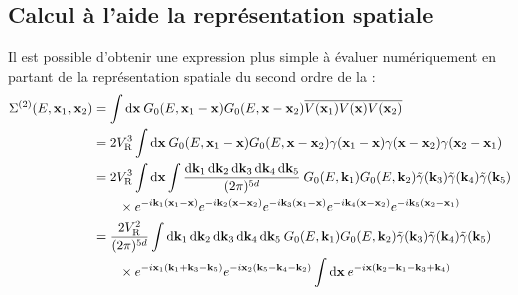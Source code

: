 \subsection{Calcul à l'aide la représentation spatiale}
Il est possible d'obtenir une expression plus simple à évaluer numériquement en partant de la représentation spatiale du second ordre de la \selfenergy :
\begin{align}
\Sigma^{(2)}(E,\mathbf{x}_{\mathrm{1}},\mathbf{x}_{\mathrm{2}}) &= \int{\diff \mathbf{x} \: G_0(E,\mathbf{x}_{\mathrm{1}} - \mathbf{x}) G_0(E,\mathbf{x}-\mathbf{x}_{\mathrm{2}}) \overline{V(\mathbf{x}_{\mathrm{1}})V(\mathbf{x})V(\mathbf{x}_{\mathrm{2}})}} \\
&=2 \VR^3 \int{\diff\mathbf{x} \: G_0(E,\mathbf{x}_{\mathrm{1}} - \mathbf{x}) G_0(E,\mathbf{x}-\mathbf{x}_{\mathrm{2}}) \gamma(\mathbf{x}_{\mathrm{1}}-\mathbf{x})\gamma(\mathbf{x}-\mathbf{x}_{\mathrm{2}})\gamma(\mathbf{x}_{\mathrm{2}}-\mathbf{x}_{\mathrm{1}})} \\
&=2 \VR^3 \int{\diff\mathbf{x} \int{\frac{\diff\mathbf{k}_{\mathrm{1}}\diff\mathbf{k}_{\mathrm{2}}\diff\mathbf{k}_{\mathrm{3}}\diff\mathbf{k}_{\mathrm{4}}\diff\mathbf{k}_{\mathrm{5}}}{(2\pi)^{5d}}\: G_0(E,\mathbf{k}_{\mathrm{1}}) G_0(E,\mathbf{k}_{\mathrm{2}}) \tilde{\gamma}(\mathbf{k}_{\mathrm{3}})\tilde{\gamma}(\mathbf{k}_{\mathrm{4}})\tilde{\gamma}(\mathbf{k}_{\mathrm{5}}) }} \\
&\nonumber \qquad\times e^{-i\mathbf{k}_{\mathrm{1}}(\mathbf{x}_{\mathrm{1}}-\mathbf{x})} e^{-i\mathbf{k}_{\mathrm{2}}(\mathbf{x}-\mathbf{x}_{\mathrm{2}})} e^{-i\mathbf{k}_{\mathrm{3}}(\mathbf{x}_{\mathrm{1}}-\mathbf{x})} e^{-i\mathbf{k}_{\mathrm{4}}(\mathbf{x}-\mathbf{x}_{\mathrm{2}})} e^{-i\mathbf{k}_{\mathrm{5}}(\mathbf{x}_{\mathrm{2}}-\mathbf{x}_{\mathrm{1}})} \\
&= \frac{2\VR^2}{(2\pi)^{5d}} \int{\diff\mathbf{k}_{\mathrm{1}}\diff\mathbf{k}_{\mathrm{2}}\diff\mathbf{k}_{\mathrm{3}}\diff\mathbf{k}_{\mathrm{4}}\diff\mathbf{k}_{\mathrm{5}}\: G_0(E,\mathbf{k}_{\mathrm{1}}) G_0(E,\mathbf{k}_{\mathrm{2}}) \tilde{\gamma}(\mathbf{k}_{\mathrm{3}})\tilde{\gamma}(\mathbf{k}_{\mathrm{4}})\tilde{\gamma}(\mathbf{k}_{\mathrm{5}})}\\
&\nonumber \qquad \times e^{-i\mathbf{x}_{\mathrm{1}} (\mathbf{k}_{\mathrm{1}}+\mathbf{k}_{\mathrm{3}}-\mathbf{k}_{\mathrm{5}})} e^{-i\mathbf{x}_{\mathrm{2}}(\mathbf{k}_{\mathrm{5}}-\mathbf{k}_{\mathrm{4}}-\mathbf{k}_{\mathrm{2}})} \int{\diff\mathbf{x}\: e^{-i\mathbf{x}(\mathbf{k}_{\mathrm{2}}-\mathbf{k}_{\mathrm{1}}-\mathbf{k}_{\mathrm{3}}+\mathbf{k}_{\mathrm{4}})}}\\

\end{align}
